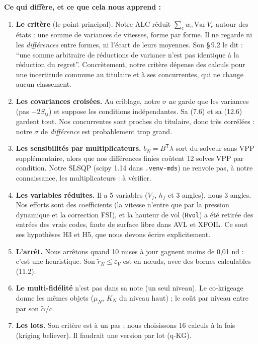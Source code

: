 \documentclass[11pt,a4paper]{article}
\newcommand{\py}[1]{\texttt{#1}}
\newcommand{\tp}{^{\mathsf{T}}}
\begin{document}
\textbf{Ce qui diffère, et ce que cela nous apprend :}
\begin{enumerate}
  \item \textbf{Le critère} (le point principal). Notre ALC réduit $\sum_c w_c\,\mathrm{Var}\,V_c$ autour des
        états : une somme de variances de vitesses, forme par forme. Il ne regarde ni les \emph{différences}
        entre formes, ni l'écart de leurs moyennes. Son §\,9.2 le dit : \enquote{une somme arbitraire de
        réductions de variance n'est pas identique à la réduction du regret}. Concrètement, notre critère
        dépense des calculs pour une incertitude commune au titulaire et à ses concurrentes, qui ne change
        aucun classement.
  \item \textbf{Les covariances croisées.} Au criblage, notre $\sigma$ ne garde que les variances (pas
        $-2S_{ij}$) et suppose les conditions indépendantes. Sa (7.6) et sa (12.6) gardent tout. Nos
        concurrentes sont proches du titulaire, donc très corrélées : notre $\sigma$ de \emph{différence} est
        probablement trop grand.
  \item \textbf{Les sensibilités par multiplicateurs.} $b_N=B\tp\bar\lambda$ sort du solveur sans VPP
        supplémentaire, alors que nos différences finies coûtent 12 solves VPP par condition. Notre SLSQP
        (scipy 1.14 dans \py{.venv-mds}) ne renvoie pas, à notre connaissance, les multiplicateurs : à vérifier.
  \item \textbf{Les variables réduites.} Il a 5 variables ($V_f$, $h_f$ et 3 angles), nous 3 angles. Nos
        efforts sont des coefficients (la vitesse n'entre que par la pression dynamique et la correction
        FSI), et la hauteur de vol (\py{Hvol}) a été retirée des entrées des vrais codes, faute de surface
        libre dans AVL et XFOIL. Ce sont ses hypothèses H3 et H5, que nous devons écrire explicitement.
  \item \textbf{L'arrêt.} Nous arrêtons quand 10 mises à jour gagnent moins de 0,01 nd : c'est une
        heuristique. Son $\tilde r_N\le\varepsilon_V$ est en nœuds, avec des bornes calculables (11.2).
  \item \textbf{Le multi-fidélité} n'est pas dans sa note (un seul niveau). Le co-krigeage donne les mêmes
        objets ($\mu_N$, $K_N$ du niveau haut) ; le coût par niveau entre par son $\tilde\alpha/c$.
  \item \textbf{Les lots.} Son critère est à un pas ; nous choisissons 16 calculs à la fois (kriging believer).
        Il faudrait une version par lot (q-KG).
\end{enumerate}
\end{document}
